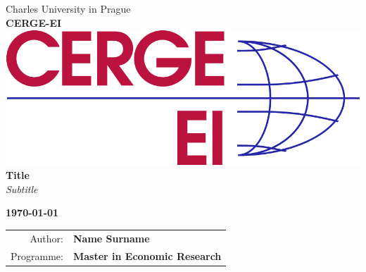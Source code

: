 \begin{titlepage}
\thispagestyle{empty} %
\setlength{\parindent}{0pt} 
\begin{center}
\vfill
    \Large Charles University in Prague
       \\[0.25cm]
     \Large\textbf{CERGE-EI}
 \\[2.8cm]
    \includegraphics[decodearray={0 1},width=0.75\linewidth]{CERGE_EI_logo_RGB.jpg}
 \\[3.2cm]

 \huge \textbf{Title}
 \\[0.25cm] 
 \Large\textit{Subtitle}

\vfill

\vspace{16mm}

{\bf\Large \today}

\vspace{15mm}



\vfill

\large
\begin{tabular}{rl}
Author: & \bf Name Surname\\
\noalign{\vspace{2mm}}
Programme: & \bf Master in Economic Research \\
\end{tabular}

\end{center}























\end{titlepage}
